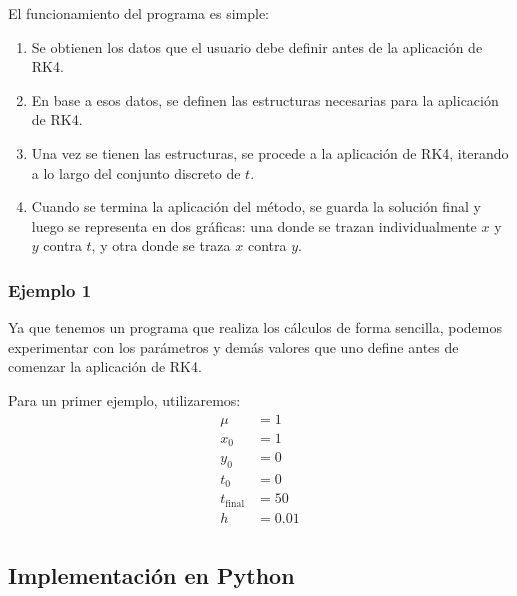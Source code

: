 \documentclass[12pt, a4paper]{article}
\begin{document}
El funcionamiento del programa es simple:
\begin{enumerate}
    \item Se obtienen los datos que el usuario debe definir antes de la aplicación de RK4.
    \item En base a esos datos, se definen las estructuras necesarias para la aplicación de RK4.
    \item Una vez se tienen las estructuras, se procede a la aplicación de RK4, iterando a lo largo del conjunto discreto de \(t\).
    \item Cuando se termina la aplicación del método, se guarda la solución final y luego se representa en dos gráficas: una donde se trazan individualmente \(x\) y \(y\) contra \(t\), y otra donde se traza \(x\) contra \(y\).
\end{enumerate}

\subsubsection{Ejemplo 1}

Ya que tenemos un programa que realiza los cálculos de forma sencilla, podemos experimentar con los parámetros y demás valores que uno define antes de comenzar la aplicación de RK4.

Para un primer ejemplo, utilizaremos:
\begin{align*}
    \mu &= 1 \\
    x_{0} &= 1 \\
    y_{0} &= 0 \\
    t_{0} &= 0 \\
    t_{\text{final}} &= 50 \\
    h &= 0.01 \\
\end{align*}


\subsection{Implementación en Python}\label{sect:python}
\end{document}
